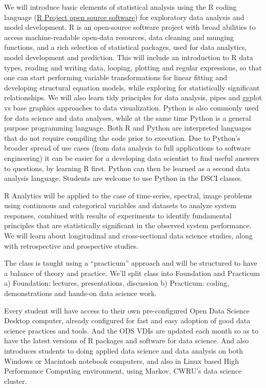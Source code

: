 \documentclass[10pt]{article} %
\begin{document}
  We will introduce basic elements of statistical analysis using the R coding language (\href{"http://cran.case.edu/"}{R Project open source software}) for exploratory data analysis and model development.
  R is an open-source software project with broad abilities to access machine-readable open-data resources, data cleaning and munging functions, and a rich selection of statistical packages, used for data analytics, model development and prediction.
  This will include an introduction to R data types, reading and writing data, looping, plotting and regular expressions, so that one can start performing variable transformations for linear fitting and developing structural equation models, while exploring for statistically significant relationships.
  We will also learn tidy principles for data analysis, pipes and ggplot vs base graphics approaches to data visualization.
  Python is also commonly used for data science and data analyses, while at the same time Python is a general purpose programming language.  Both R and Python are interpreted languages that do not require compiling the code prior to execution.
  Due to Python's broader spread of use cases (from data analysis to full applications to software engineering) it can be easier for a developing data scientist to find useful answers to questions, by learning R first.
  Python can then be learned as a second data analysis language.
  Students are welcome to use Python in the DSCI classes.

  R Analytics will be applied to the case of time-series, spectral, image problems using continuous and categorical variables and  datasets to analyze system responses, combined with results of experiments to identify fundamental principles that are statistically significant in the observed system performance.
  We will learn about longitudinal and cross-sectional data science studies, along with retrospective and prospective studies.

  The class is taught using a ``practicum'' approach and will be structured to have a balance of theory and practice.
  We'll split class into Foundation and Practicum
    a) Foundation: lectures, presentations, discussion
    b) Practicum: coding, demonstrations and hands-on data science work.

  Every student will have access to their own pre-configured Open Data Science Desktop computer, already configured for fast and easy adoption of good data science practices and tools.
  And the ODS VDIs are updated each month so as to have the latest versions of R packages and software for data science.
  And also introduces students to doing applied data science and data analysis on both Windows or Macintosh notebook computers, and also in Linux based High Performance Computing environment, using Markov, CWRU's data science cluster.
\end{document}
